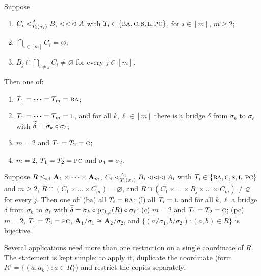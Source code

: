 \begin{longtheorem}\label{thm:stable-intersection}
Suppose
\begin{enumerate}\romanlabels\tightlist
\item $C_{i}\subt[A]{T_{i}(\sigma_{i})}B_{i}\lll A$ with
  $T_{i}\in\{\TBA,\TC,\TS,\TL,\TPC\}$, for $i\in[m]$, $m\ge 2$;
\item $\bigcap_{i\in[m]}C_{i}=\varnothing$;
\item $B_{j}\cap\bigcap_{i\neq j}C_{i}\neq\varnothing$ for every $j\in[m]$.
\end{enumerate}
Then one of:
\begin{enumerate}\tightlist
\item[\textup{(ba)}] $T_{1}=\dots=T_{m}=\TBA$;
\item[\textup{(l)}] $T_{1}=\dots=T_{m}=\TL$, and for all $k,\ell\in[m]$ there
  is a bridge $\delta$ from $\sigma_{k}$ to $\sigma_{\ell}$ with
  $\bcol{\delta}=\sigma_{k}\circ\sigma_{\ell}$;
\item[\textup{(c)}] $m=2$ and $T_{1}=T_{2}=\TC$;
\item[\textup{(pc)}] $m=2$, $T_{1}=T_{2}=\TPC$ and $\sigma_{1}=\sigma_{2}$.
\end{enumerate}
\end{longtheorem}

\begin{longcorollary}\label{cor:stable-intersection}
Suppose $R\sdle\mathbf A_{1}\times\dots\times\mathbf A_{m}$,
$C_{i}\subt[A_{i}]{T_{i}(\sigma_{i})}B_{i}\lll A_{i}$ with
$T_{i}\in\{\TBA,\TC,\TS,\TL,\TPC\}$ and $m\ge 2$,
$R\cap(C_{1}\times\dots\times C_{m})=\varnothing$, and
$R\cap(C_{1}\times\dots\times B_{j}\times\dots\times C_{m})\neq\varnothing$ for
every $j$. Then one of:
\textup{(ba)} all $T_{i}=\TBA$;
\textup{(l)} all $T_{i}=\TL$ and for all $k,\ell$ a bridge $\delta$ from
$\sigma_{k}$ to $\sigma_{\ell}$ with
$\bcol{\delta}=\sigma_{k}\circ\proj_{k,\ell}(R)\circ\sigma_{\ell}$;
\textup{(c)} $m=2$ and $T_{1}=T_{2}=\TC$;
\textup{(pc)} $m=2$, $T_{1}=T_{2}=\TPC$,
$\mathbf A_{1}/\sigma_{1}\cong\mathbf A_{2}/\sigma_{2}$, and
$\{(a/\sigma_{1},b/\sigma_{2}):(a,b)\in R\}$ is bijective.
\end{longcorollary}

\begin{remark}\label{rem:duplicate-coordinate}
Several applications need more than one restriction on a single coordinate of
$R$. The statement is kept simple; to apply it, duplicate the coordinate (form
$R'=\{(\bar a,a_{k}):\bar a\in R\}$) and restrict the copies separately.
\end{remark}

